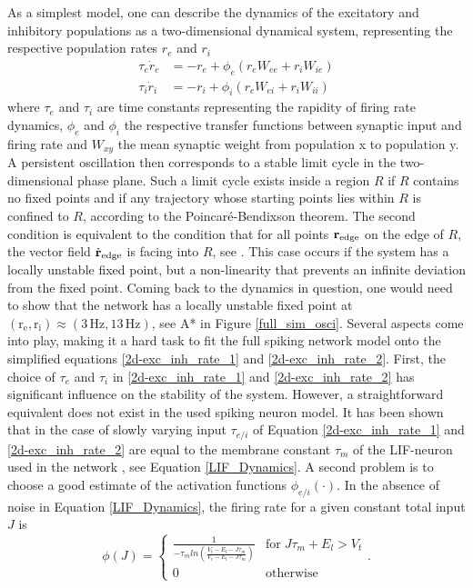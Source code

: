 \documentclass[10pt,a4paper]{article}
\begin{document}
As a simplest model, one can describe the dynamics of the excitatory and inhibitory populations as a two-dimensional dynamical system, representing the respective population rates $r_e$ and $r_i$
\begin{align}
\tau_e \dot{r}_e  &= -r_e + \phi_e(r_e W_{ee} + r_i W_{ie}) \label{2d-exc_inh_rate_1} \\
\tau_i \dot{r}_i  &= -r_i + \phi_i(r_e W_{ei} + r_i W_{ii}) \label{2d-exc_inh_rate_2}
\end{align}
where $\tau_e$ and $\tau_i$ are time constants representing the rapidity of firing rate dynamics, $\phi_e$ and $\phi_i$ the respective transfer functions between synaptic input and firing rate and $W_{xy}$ the mean synaptic weight from population x to population y. A persistent oscillation then corresponds to a stable limit cycle in the two-dimensional phase plane. Such a limit cycle exists inside a region $R$ if $R$ contains no fixed points and if any trajectory whose starting points lies within $R$ is confined to $R$, according to the Poincaré-Bendixson theorem. The second condition is equivalent to the condition that for all points $\mathbf{r}_{\rm edge}$ on the edge of $R$, the vector field $\dot{\mathbf{r}}_{\rm edge}$ is facing into $R$, see \cite[p.~248]{Dyn_Sys_Hirsch}. This case occurs if the system has a locally unstable fixed point, but a non-linearity that prevents an infinite deviation from the fixed point.
Coming back to the dynamics in question, one would need to show that the network has a locally unstable fixed point at $\mathrm{(r_e,r_i)\approx (3\, Hz, 13\, Hz)}$, see A* in Figure \ref{full_sim_osci}. Several aspects come into play, making it a hard task to fit the full spiking network model onto the simplified equations \eqref{2d-exc_inh_rate_1} and \ref{2d-exc_inh_rate_2}. First, the choice of $\tau_e$ and $\tau_i$ in \ref{2d-exc_inh_rate_1} and \ref{2d-exc_inh_rate_2} has significant influence on the stability of the system. However, a straightforward equivalent does not exist in the used spiking neuron model. It has been shown that in the case of slowly varying input $\tau_{e/i}$ of Equation \eqref{2d-exc_inh_rate_1} and \eqref{2d-exc_inh_rate_2} are equal to the membrane constant $\tau_m$ of the LIF-neuron used in the network \cite{Gerstner_Pop_Act}, see Equation \eqref{LIF_Dynamics}. A second problem is to choose a good estimate of the activation functions $\phi_{e/i}( \cdot )$. In the absence of noise in Equation \eqref{LIF_Dynamics}, the firing rate for a given constant total input $J$ is
\begin{equation}
\phi(J) = \begin{cases}\frac{1}{-\tau_m ln \left( \frac{V_t -E_l-J\tau_m}{V_r -E_l-J\tau_m} \right)} & \mathrm{for}\; J\tau_m + E_l > V_t\\
0 & \mathrm{otherwise}
\end{cases}.
\label{LIF_Fir_Rate_no_Noise}
\end{equation}
\end{document}

